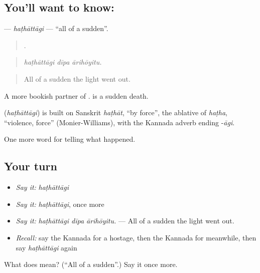 \subsection*{You'll want to know: }
\textbf{} — \emph{haṭhāttāgi} — \textquotedblleft{}all of a sudden\textquotedblright{}.

\begin{quote}
  .
\end{quote}

\begin{quote}
\emph{haṭhāttāgi dīpa ārihōyitu.}
\end{quote}

\begin{quote}
All of a sudden the light went out.
\end{quote}

A more bookish partner of .   is a sudden death.

\begin{cousinweb}
\textbf{} (\emph{haṭhāttāgi}) is built on Sanskrit \emph{haṭhāt}, \textquotedblleft{}by force\textquotedblright{}, the ablative of \emph{haṭha}, \textquotedblleft{}violence, force\textquotedblright{} (Monier-Williams), with the Kannada adverb ending -\emph{āgi}.
\end{cousinweb}

\begin{grammarlens}[title={What you've built}]
One more word for telling what happened.
\end{grammarlens}

\subsection*{Your turn}
\begin{itemize}
\raggedright
  \item \emph{Say it:} \emph{haṭhāttāgi}
  \item \emph{Say it:} \emph{haṭhāttāgi}, once more
  \item \emph{Say it:} \emph{haṭhāttāgi dīpa ārihōyitu.} — All of a sudden the light went out.
  \item \emph{Recall:} say the Kannada for a hostage, then the Kannada for meanwhile, then say \emph{haṭhāttāgi} again
\end{itemize}

\begin{tcolorbox}[breakable,colback=teal!4,colframe=teal!35!black,title={Before you move on}]
What does  mean? (\textquotedblleft{}All of a sudden\textquotedblright{}.) Say it once more.
\end{tcolorbox}
